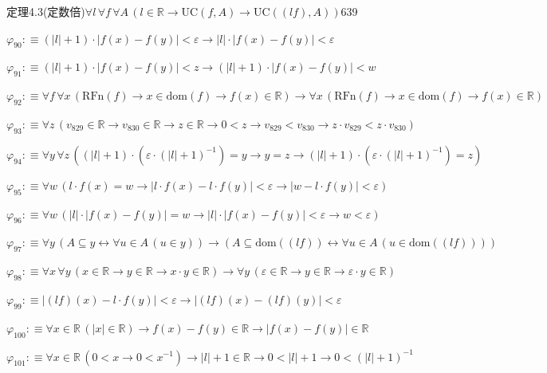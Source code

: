 \begin{fullproof}{定理4.3(定数倍)}{$\forall l\,\forall f\,\forall A\,(l \in \mathbb{R} \to \mathrm{UC}(f,A) \to \mathrm{UC}((l f),A))$}{639}
\begin{abbrevlist}
\item $\varphi_{90} :\equiv (\lvert l \rvert + 1) \cdot \lvert f(x) - f(y) \rvert < \varepsilon \to \lvert l \rvert \cdot \lvert f(x) - f(y) \rvert < \varepsilon$
\item $\varphi_{91} :\equiv (\lvert l \rvert + 1) \cdot \lvert f(x) - f(y) \rvert < z \to (\lvert l \rvert + 1) \cdot \lvert f(x) - f(y) \rvert < w$
\item $\varphi_{92} :\equiv \forall f\,\forall x\,(\mathrm{RFn}(f) \to x \in \mathrm{dom}(f) \to f(x) \in \mathbb{R}) \to \forall x\,(\mathrm{RFn}(f) \to x \in \mathrm{dom}(f) \to f(x) \in \mathbb{R})$
\item $\varphi_{93} :\equiv \forall z\,(v_{829} \in \mathbb{R} \to v_{830} \in \mathbb{R} \to z \in \mathbb{R} \to 0 < z \to v_{829} < v_{830} \to z \cdot v_{829} < z \cdot v_{830})$
\item $\varphi_{94} :\equiv \forall y\,\forall z\,((\lvert l \rvert + 1) \cdot (\varepsilon \cdot (\lvert l \rvert + 1)^{-1}) = y \to y = z \to (\lvert l \rvert + 1) \cdot (\varepsilon \cdot (\lvert l \rvert + 1)^{-1}) = z)$
\item $\varphi_{95} :\equiv \forall w\,(l \cdot f(x) = w \to \lvert l \cdot f(x) - l \cdot f(y) \rvert < \varepsilon \to \lvert w - l \cdot f(y) \rvert < \varepsilon)$
\item $\varphi_{96} :\equiv \forall w\,(\lvert l \rvert \cdot \lvert f(x) - f(y) \rvert = w \to \lvert l \rvert \cdot \lvert f(x) - f(y) \rvert < \varepsilon \to w < \varepsilon)$
\item $\varphi_{97} :\equiv \forall y\,(A \subseteq y \leftrightarrow \forall u \in A\,(u \in y)) \to (A \subseteq \mathrm{dom}((l f)) \leftrightarrow \forall u \in A\,(u \in \mathrm{dom}((l f))))$
\item $\varphi_{98} :\equiv \forall x\,\forall y\,(x \in \mathbb{R} \to y \in \mathbb{R} \to x \cdot y \in \mathbb{R}) \to \forall y\,(\varepsilon \in \mathbb{R} \to y \in \mathbb{R} \to \varepsilon \cdot y \in \mathbb{R})$
\item $\varphi_{99} :\equiv \lvert (l f)(x) - l \cdot f(y) \rvert < \varepsilon \to \lvert (l f)(x) - (l f)(y) \rvert < \varepsilon$
\item $\varphi_{100} :\equiv \forall x \in \mathbb{R}\,(\lvert x \rvert \in \mathbb{R}) \to f(x) - f(y) \in \mathbb{R} \to \lvert f(x) - f(y) \rvert \in \mathbb{R}$
\item $\varphi_{101} :\equiv \forall x \in \mathbb{R}\,(0 < x \to 0 < x^{-1}) \to \lvert l \rvert + 1 \in \mathbb{R} \to 0 < \lvert l \rvert + 1 \to 0 < (\lvert l \rvert + 1)^{-1}$

\end{abbrevlist}
\end{fullproof}
